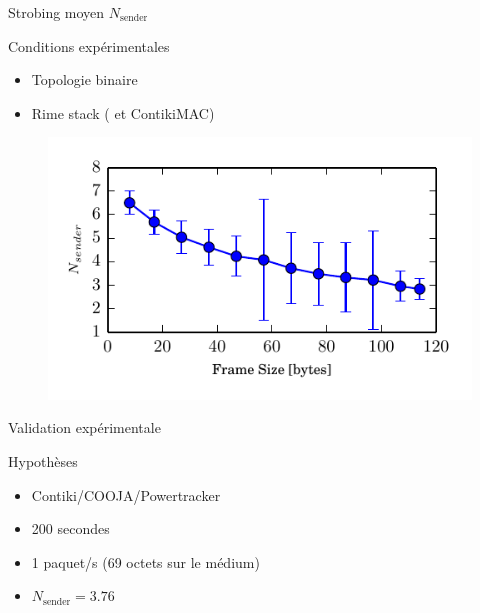 \begin{frame}{Strobing moyen $N_{\textrm{sender}}$}
  \begin{block}{Conditions expérimentales}
    \begin{itemize}
      \item Topologie binaire
      \item Rime stack (\ieee{} et ContikiMAC)
    \end{itemize}
  \end{block}
  \begin{figure}
    \includegraphics[width=.8\textwidth]{figures/average_strobbing.pdf}
  \end{figure}
\end{frame}

\begin{frame}{Validation expérimentale}
  \begin{block}{Hypothèses}
    \begin{itemize}
      \item Contiki/COOJA/Powertracker
      \item 200 secondes
      \item 1 paquet/s (69 octets sur le médium)
      \item $N_{\textrm{sender}} = 3.76$
    \end{itemize}
  \end{block}
  \begin{figure}
    \centering
    
  \end{figure}
\end{frame}

